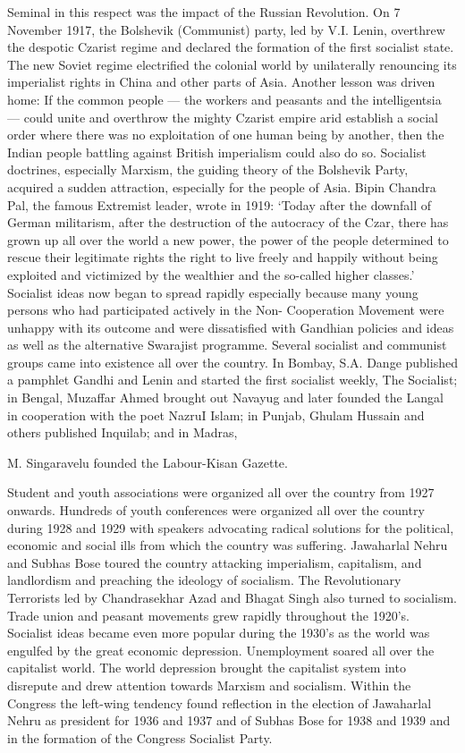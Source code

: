 \begin{multicols}{2}
Seminal in this respect was the impact of the Russian Revolution. On 7 November 1917, the Bolshevik (Communist) party, led by V.I. Lenin, overthrew the despotic Czarist regime and declared the formation of the first socialist state. The new Soviet regime electrified the colonial world by unilaterally renouncing its imperialist rights in China and other parts of Asia. Another lesson was driven home: If the common people --- the workers and peasants and the intelligentsia --- could unite and overthrow the mighty Czarist empire arid establish a social order where there was no exploitation of one human being by another, then the Indian people battling against British imperialism could also do so. Socialist doctrines, especially Marxism, the guiding theory of the Bolshevik Party, acquired a sudden attraction, especially for the people of Asia. Bipin Chandra Pal, the famous Extremist leader, wrote in 1919: `Today after the downfall of German militarism, after the destruction of the autocracy of the Czar, there has grown up all over the world a new power, the power of the people determined to rescue their legitimate rights the right to live freely and happily without being exploited and victimized by the wealthier and the so-called higher classes.' Socialist ideas now began to spread rapidly especially because many young persons who had participated actively in the Non- Cooperation Movement were unhappy with its outcome and were dissatisfied with Gandhian policies and ideas as well as the alternative Swarajist programme. Several socialist and communist groups came into existence all over the country. In Bombay, S.A. Dange published a pamphlet Gandhi and Lenin and started the first socialist weekly, The Socialist; in Bengal, Muzaffar Ahmed brought out Navayug and later founded the Langal in cooperation with the poet NazruI Islam; in Punjab, Ghulam Hussain and others published Inquilab; and in Madras, 

M. Singaravelu founded the Labour-Kisan Gazette. 

Student and youth associations were organized all over the country from 1927 onwards. Hundreds of youth conferences were organized all over the country during 1928 and 1929 with speakers advocating radical solutions for the political, economic and social ills from which the country was suffering. Jawaharlal Nehru and Subhas Bose toured the country attacking imperialism, capitalism, and landlordism and preaching the ideology of socialism. The Revolutionary Terrorists led by Chandrasekhar Azad and Bhagat Singh also turned to socialism. Trade union and peasant movements grew rapidly throughout the 1920's. Socialist ideas became even more popular during the 1930's as the world was engulfed by the great economic depression. Unemployment soared all over the capitalist world. The world depression brought the capitalist system into disrepute and drew attention towards Marxism and socialism. Within the Congress the left-wing tendency found reflection in the election of Jawaharlal Nehru as president for 1936 and 1937 and of Subhas Bose for 1938 and 1939 and in the formation of the Congress Socialist Party.


\end{multicols}
